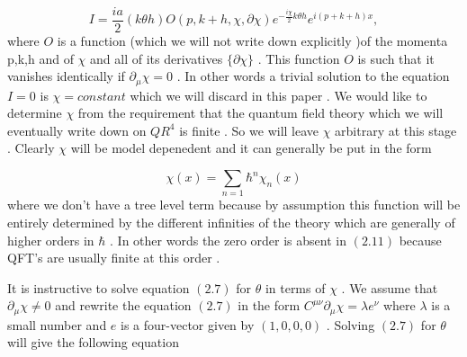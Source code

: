 \documentclass[a4paper,12pt]{article}
\begin{document}
\begin{equation}
I=\frac{ia}{2}(k{\theta}h)O(p,k+h,{\chi},{\partial}{\chi})e^{-\frac{i{\chi}}{2}k{\theta}h}e^{i(p+k+h)x},
\end{equation}
where $O$ is a function (which we will not write down explicitly
)of the momenta p,k,h and of ${\chi}$ and all of its derivatives
$\{{\partial}{\chi}\}$ . This function $O$ is such that it
vanishes identically if ${\partial}_{\mu}{\chi}=0$ . In other
words a trivial solution to the equation $I=0$ is
${\chi}=constant$ which we will discard in this paper . We would
like to determine ${\chi}$ from the requirement that the quantum
field theory which we will eventually write
 down on $QR^4$ is finite . So we will leave ${\chi}$ arbitrary at this stage .
 Clearly ${\chi}$ will be model depenedent and it can generally be put in the form

\begin{equation}
{\chi}(x)=\sum_{n=1}{\hbar}^n{\chi}_n(x)
\end{equation}
where we don't have a tree level term because by assumption this function will be entirely determined by the different
 infinities of the theory which are generally of higher orders in $\hbar$ . In other words
 the zero order is absent in $(2.11)$ because QFT's are usually finite at this order .

It is instructive to solve equation $(2.7)$ for ${\theta}$ in
terms of ${\chi}$ . We assume that
${\partial}_{\mu}{\chi}{\neq}0$ and rewrite the equation $(2.7)$
in the form $
C^{{\mu}{\nu}}{\partial}_{\mu}{\chi}={\lambda}e^{\nu} $  where
${\lambda}$ is a small number and $e$ is a four-vector given by
$(1,0,0,0)$ . Solving $(2.7)$ for ${\theta}$ will give
  the following equation
\end{document}
